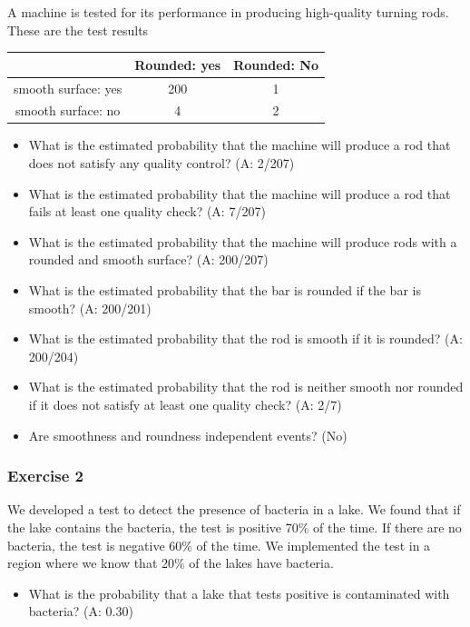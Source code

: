 \documentclass[
]{book}
\providecommand{\tightlist}{%
  \setlength{\itemsep}{0pt}\setlength{\parskip}{0pt}}
\begin{document}
A machine is tested for its performance in producing high-quality turning rods. These are the test results

\begin{longtable}[]{@{}ccc@{}}
\toprule\noalign{}
& Rounded: yes & Rounded: No \\
\midrule\noalign{}
\endhead
\bottomrule\noalign{}
\endlastfoot
smooth surface: yes & 200 & 1 \\
smooth surface: no & 4 & 2 \\
\end{longtable}

\begin{itemize}
\item
  What is the estimated probability that the machine will produce a rod that does not satisfy any quality control? (A: 2/207)
\item
  What is the estimated probability that the machine will produce a rod that fails at least one quality check? (A: 7/207)
\item
  What is the estimated probability that the machine will produce rods with a rounded and smooth surface? (A: 200/207)
\item
  What is the estimated probability that the bar is rounded if the bar is smooth? (A: 200/201)
\item
  What is the estimated probability that the rod is smooth if it is rounded? (A: 200/204)
\item
  What is the estimated probability that the rod is neither smooth nor rounded if it does not satisfy at least one quality check? (A: 2/7)
\item
  Are smoothness and roundness independent events? (No)
\end{itemize}

\hypertarget{exercise-2-1}{%
\subsubsection{Exercise 2}\label{exercise-2-1}}

We developed a test to detect the presence of bacteria in a lake. We found that if the lake contains the bacteria, the test is positive 70\% of the time. If there are no bacteria, the test is negative 60\% of the time. We implemented the test in a region where we know that 20\% of the lakes have bacteria.

\begin{itemize}
\tightlist
\item
  What is the probability that a lake that tests positive is contaminated with bacteria? (A: 0.30)
\end{itemize}
\end{document}
